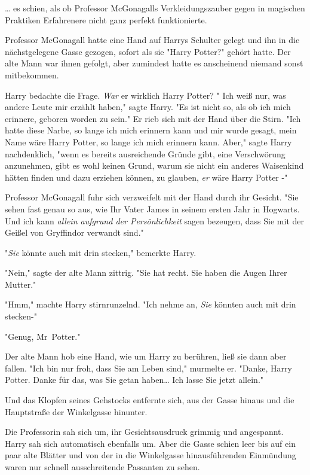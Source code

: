 {… es schien, als ob Professor McGonagalls Verkleidungszauber gegen in magischen Praktiken Erfahrenere nicht ganz perfekt funktionierte.

Professor McGonagall hatte eine Hand auf Harrys Schulter gelegt und ihn in die nächstgelegene Gasse gezogen, sofort als sie "Harry Potter?" gehört hatte. Der alte Mann war ihnen gefolgt, aber zumindest hatte es anscheinend niemand sonst mitbekommen.

Harry bedachte die Frage. \emph{War} er wirklich Harry Potter? " Ich weiß nur, was andere Leute mir erzählt haben," sagte Harry. "Es ist nicht so, als ob ich mich erinnere, geboren worden zu sein." Er rieb sich mit der Hand über die Stirn. "Ich hatte diese Narbe, so lange ich mich erinnern kann und mir wurde gesagt, mein Name wäre Harry Potter, so lange ich mich erinnern kann. Aber," sagte Harry nachdenklich, "wenn es bereits ausreichende Gründe gibt, eine Verschwörung anzunehmen, gibt es wohl keinen Grund, warum sie nicht ein anderes Waisenkind hätten finden und dazu erziehen können, zu glauben, \emph{er} wäre Harry Potter -"

Professor McGonagall fuhr sich verzweifelt mit der Hand durch ihr Gesicht. "Sie sehen fast genau so aus, wie Ihr Vater James in seinem ersten Jahr in Hogwarts. Und ich kann \emph{allein aufgrund der Persönlichkeit} sagen bezeugen, dass Sie mit der Geißel von Gryffindor verwandt sind."

"\emph{Sie} könnte auch mit drin stecken," bemerkte Harry.

"Nein," sagte der alte Mann zittrig. "Sie hat recht. Sie haben die Augen Ihrer Mutter."

"Hmm," machte Harry stirnrunzelnd. "Ich nehme an, \emph{Sie} könnten auch mit drin stecken-"

"Genug, Mr~Potter."

Der alte Mann hob eine Hand, wie um Harry zu berühren, ließ sie dann aber fallen. "Ich bin nur froh, dass Sie am Leben sind," murmelte er. "Danke, Harry Potter. Danke für das, was Sie getan haben… Ich lasse Sie jetzt allein."

Und das Klopfen seines Gehstocks entfernte sich, aus der Gasse hinaus und die Hauptstraße der Winkelgasse hinunter.

Die Professorin sah sich um, ihr Gesichtsausdruck grimmig und angespannt. Harry sah sich automatisch ebenfalls um. Aber die Gasse schien leer bis auf ein paar alte Blätter und von der in die Winkelgasse hinausführenden Einmündung waren nur schnell ausschreitende Passanten zu sehen.

}
